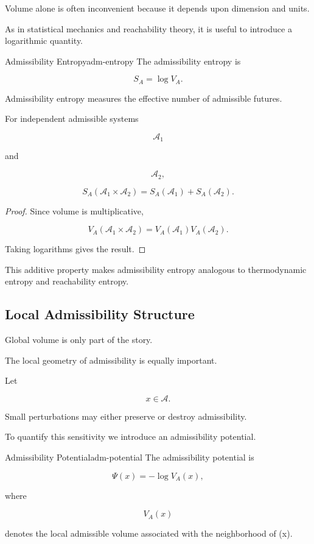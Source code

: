 \documentclass[12pt,twoside,openright]{book}
\newenvironment{prop}
{\begin{proposition}{}{}}
{\end{proposition}}
\begin{document}
Volume alone is often inconvenient because it depends upon
dimension and units.

As in statistical mechanics and reachability theory, it
is useful to introduce a logarithmic quantity.

\begin{definition}{Admissibility Entropy}{adm-entropy}
The admissibility entropy is

\[
S_A
=

\log V_A.
\]
\end{definition}

Admissibility entropy measures the effective number of
admissible futures.

\begin{prop}
For independent admissible systems

\[
\mathcal A_1
\]

and

\[
\mathcal A_2,
\]

\[
S_A(\mathcal A_1\times\mathcal A_2)
=

S_A(\mathcal A_1)
+
S_A(\mathcal A_2).
\]
\end{prop}

\begin{proof}
Since volume is multiplicative,

\[
V_A(\mathcal A_1\times\mathcal A_2)
=

V_A(\mathcal A_1)
V_A(\mathcal A_2).
\]

Taking logarithms gives the result.
\end{proof}

This additive property makes admissibility entropy
analogous to thermodynamic entropy and reachability
entropy.

\subsection{Local Admissibility Structure}

Global volume is only part of the story.

The local geometry of admissibility is equally important.

Let

\[
x\in\mathcal A.
\]

Small perturbations may either preserve or destroy
admissibility.

To quantify this sensitivity we introduce an
admissibility potential.

\begin{definition}{Admissibility Potential}{adm-potential}
The admissibility potential is

\[
\Psi(x)
=

-\log V_A(x),
\]

where

\[
V_A(x)
\]

denotes the local admissible volume associated with the
neighborhood of (x).
\end{definition}
\end{document}
